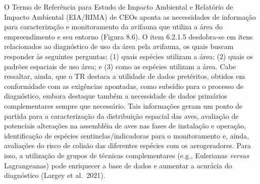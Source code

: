 \documentclass[
  oneside]{scrbook}
\begin{document}
O Termo de Referência para Estudo de Impacto Ambiental e Relatório de Impacto Ambiental (EIA/RIMA) de CEOs aponta as necessidades de informação para caracterização e monitoramento da avifauna que utiliza a área do empreendimento e seu entorno (Figura 8.6). O item 6.2.1.5 desdobra-se em itens relacionados ao diagnóstico de uso da área pela avifauna, os quais buscam responder às seguintes perguntas: (1) quais espécies utilizam a área; (2) quais os padrões espaciais de uso área; e (3) como as espécies utilizam a área. Cabe ressaltar, ainda, que o TR destaca a utilidade de dados pretéritos, obtidos em conformidade com as exigências apontadas, como subsídio para o processo de diagnóstico, embora destaque também a necessidade de dados primários complementares sempre que necessário. Tais informações geram um ponto de partida para a caracterização da distribuição espacial das aves, avaliação de potenciais alterações na assembléia de aves nas fases de instalação e operação, identificação de espécies sentinelas/indicadoras para o monitoramento e, ainda, avaliações do risco de colisão das diferentes espécies com os aerogeradores. Para isso, a utilização de grupos de técnicas complementares (e.g., Eulerianas \emph{versus} Lagrangeanas) pode enriquecer a base de dados e aumentar a acurácia do diagnóstico (Largey et al.~2021).
\end{document}
